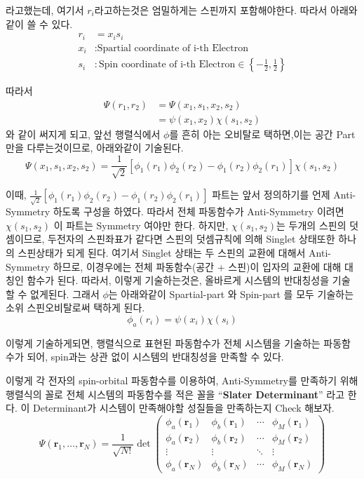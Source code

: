 \documentclass[11pt]{article}
\begin{document}
라고했는데, 
여기서 \(r_i\)라고하는것은 엄밀하게는 스핀까지 포함해야한다. 따라서 아래와같이 쓸 수 있다. 
\begin{align*}
r_i &= x_i s_i\\
x_i &: \text{Spartial coordinate of i-th Electron}\\
s_i &: \text{Spin coordinate of i-th Electron} \in \left\{-\frac{1}{2}, \frac{1}{2}\right\}
\end{align*}

따라서 
\begin{align*}
\Psi(r_1,r_2)&=\Psi(x_1,s_1, x_2,s_2)\\
&=\psi(x_1, x_2)\chi(s_1,s_2)
\end{align*}
와 같이 써지게 되고, 앞선 행렬식에서 \(\phi\)를 흔히 아는 오비탈로 택하면,이는 공간 Part 만을 다루는것이므로, 아래와같이 기술된다. 
\[
\Psi(x_1,s_1, x_2,s_2) = \frac{1}{\sqrt{2}}[\phi_1(r_1)\phi_2(r_2)-\phi_1(r_2)\phi_2(r_1)]\chi(s_1,s_2)
\]

이때, \(\frac{1}{\sqrt{2}}[\phi_1(r_1)\phi_2(r_2)-\phi_1(r_2)\phi_2(r_1)]\) 파트는 앞서 정의하기를 언제 Anti-Symmetry 하도록 구성을 하였다. 
따라서 전체 파동함수가 Anti-Symmetry 이려면 \(\chi(s_1,s_2)\) 이 파트는 Symmetry 여야만 한다. 
하지만, \(\chi(s_1,s_2)\)는 두개의 스핀의 덧셈이므로, 두전자의 스핀좌표가 같다면 스핀의 덧셈규칙에 의해 Singlet 상태또한 하나의 스핀상태가 되게 된다. 
여기서 Singlet 상태는 두 스핀의 교환에 대해서 Anti-Symmetry 하므로, 이경우에는 전체 파동함수(공간 + 스핀)이 입자의 교환에 대해 대칭인 함수가 된다. 
따라서, 이렇게 기술하는것은, 올바르게 시스템의 반대칭성을 기술할 수 없게된다. 
그래서 \(\phi\)는 아래와같이 Spartial-part 와 Spin-part 를 모두 기술하는 소위 스핀오비탈로써 택하게 된다. 
\[
\phi_a(r_i) = \psi(x_i)\chi(s_i)
\]

이렇게 기술하게되면, 
행렬식으로 표현된 파동함수가 전체 시스템을 기술하는 파동함수가 되어, spin과는 상관 없이 시스템의 반대칭성을 만족할 수 있다. 

이렇게 각 전자의 spin-orbital 파동함수를 이용하여, Anti-Symmetry를 만족하기 위해 행렬식의 꼴로 전체 시스템의 파동함수를 적은 꼴을 \enquote{\textbf{Slater Determinant}} 라고 한다. 
이 Determinant가 시스템이 만족해야할 성질들을 만족하는지 Check 해보자. 
\[
\Psi(\mathbf{r}_1, \dots, \mathbf{r}_N) 
= \frac{1}{\sqrt{N!}} \det \begin{pmatrix}
\phi_a(\mathbf{r}_1) & \phi_b(\mathbf{r}_1) & \cdots & \phi_M(\mathbf{r}_1) \\
\phi_a(\mathbf{r}_2) & \phi_b(\mathbf{r}_2) & \cdots & \phi_M(\mathbf{r}_2) \\
\vdots & \vdots & \ddots & \vdots \\
\phi_a(\mathbf{r}_N) & \phi_b(\mathbf{r}_N) & \cdots & \phi_M(\mathbf{r}_N)
\end{pmatrix}
\]
\end{document}
